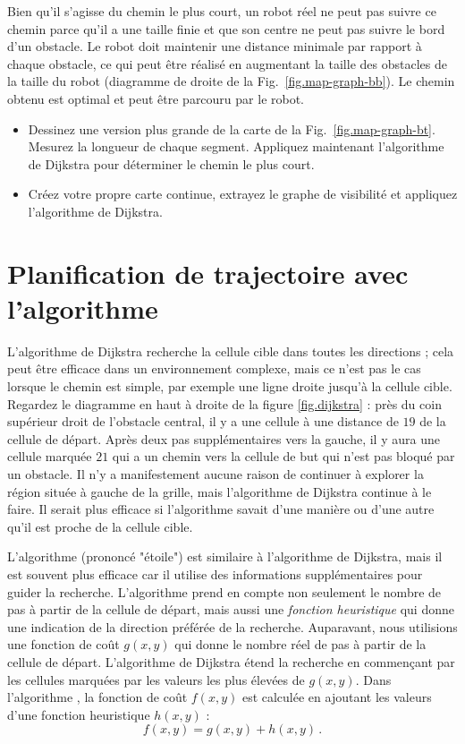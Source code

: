 Bien qu'il s'agisse du chemin le plus court, un robot réel ne peut pas suivre ce chemin parce qu'il a une taille finie et que son centre ne peut pas suivre le bord d'un obstacle. Le robot doit maintenir une distance minimale par rapport à chaque obstacle, ce qui peut être réalisé en augmentant la taille des obstacles de la taille du robot (diagramme de droite de la Fig.~\ref{fig.map-graph-bb}). Le chemin obtenu est optimal et peut être parcouru par le robot.

\begin{framed}
\begin{itemize}
\item Dessinez une version plus grande de la carte de la Fig.~\ref{fig.map-graph-bt}. Mesurez la longueur de chaque segment. Appliquez maintenant l'algorithme de Dijkstra pour déterminer le chemin le plus court.
\item Créez votre propre carte continue, extrayez le graphe de visibilité et appliquez l'algorithme de Dijkstra.
\end{itemize}
\end{framed}

\section{Planification de trajectoire avec l'algorithme \astar{}}\label{s.astar}

L'algorithme de Dijkstra recherche la cellule cible dans toutes les directions ; cela peut être efficace dans un environnement complexe, mais ce n'est pas le cas lorsque le chemin est simple, par exemple une ligne droite jusqu'à la cellule cible. Regardez le diagramme en haut à droite de la figure \ref{fig.dijkstra} : près du coin supérieur droit de l'obstacle central, il y a une cellule à une distance de $19$ de la cellule de départ. Après deux pas supplémentaires vers la gauche, il y aura une cellule marquée $21$ qui a un chemin vers la cellule de but qui n'est pas bloqué par un obstacle. Il n'y a manifestement aucune raison de continuer à explorer la région située à gauche de la grille, mais l'algorithme de Dijkstra continue à le faire. Il serait plus efficace si l'algorithme savait d'une manière ou d'une autre qu'il est proche de la cellule cible.

L'algorithme \emph{\astar{}} (prononcé "étoile") est similaire à l'algorithme de Dijkstra, mais il est souvent plus efficace car il utilise des informations supplémentaires pour guider la recherche. L'algorithme \astar{} prend en compte non seulement le nombre de pas à partir de la cellule de départ, mais aussi une \emph{fonction heuristique} qui donne une indication de la direction préférée de la recherche. Auparavant, nous utilisions une fonction de coût $g(x,y)$ qui donne le nombre réel de pas à partir de la cellule de départ. L'algorithme de Dijkstra étend la recherche en commençant par les cellules marquées par les valeurs les plus élevées de $g(x,y)$. Dans l'algorithme \astar{}, la fonction de coût $f(x,y)$ est calculée en ajoutant les valeurs d'une fonction heuristique $h(x,y)$ :
\[
f(x,y) = g(x,y) + h(x,y)\,.
\]

